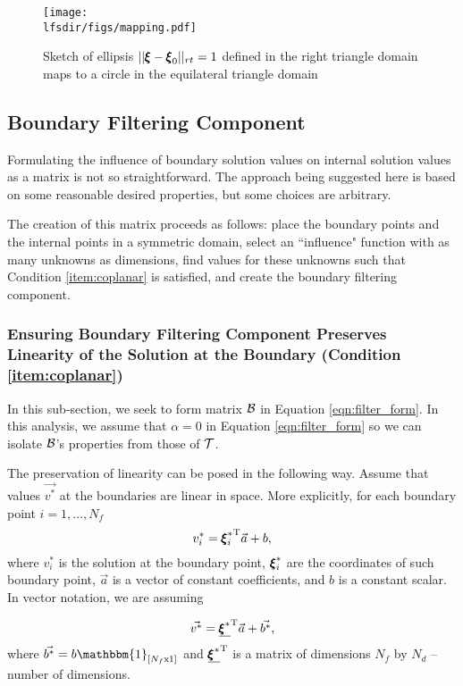 \begin{figure}\centering
\texttt{[image: \\lfsdir/figs/mapping.pdf]}
\caption{Sketch of ellipsis $||{\pmb \xi} -{\pmb \xi}_0||_{rt} = 1$ defined in the right triangle domain maps to a circle in the equilateral triangle domain}
\label{fig:mapping}
\end{figure}

\subsection{Boundary Filtering Component}

Formulating the influence of boundary solution values on internal solution values as a matrix is not so straightforward. The approach being suggested here is based on some reasonable desired properties, but some choices are arbitrary. 

The creation of this matrix proceeds as follows: place the boundary points and the internal points in a symmetric domain, select an ``influence" function with as many unknowns as dimensions, find values for these unknowns such that Condition \ref{item:coplanar} is satisfied, and create the boundary filtering component.

\subsubsection{Ensuring Boundary Filtering Component Preserves Linearity of the Solution at the Boundary (Condition \ref{item:coplanar})}
In this sub-section, we seek to form matrix $\mathcal{B}$ in Equation \ref{eqn:filter_form}. In this analysis, we assume that $\alpha = 0$ in Equation \ref{eqn:filter_form} so we can isolate $\mathcal{B}$'s properties from those of $\mathcal{T}$.

The preservation of linearity can be posed in the following way. Assume that values $\vec{v^*}$ at the boundaries are linear in space. More explicitly, for each boundary point $i = 1,\dots,N_f$
\begin{equation}
v^*_i = {{\pmb \xi}^*_i}^\mathrm{T}\vec{a} + b,
\end{equation}
where $v^*_i$ is the solution at the \ith boundary point, ${\pmb \xi}_i^*$ are the coordinates of such boundary point, $\vec{a}$ is a vector of constant coefficients, and $b$ is a constant scalar. In vector notation, we are assuming

\begin{equation}
\label{eq:linear}
\vec{v^*} = \underline{{\pmb \xi}^*}^\mathrm{T}\vec{a} + \vec{b^*},
\end{equation}
where $\vec{b^*} = b\mathbbm{1}_{[N_f \mathrm{x} 1]}$ and $\underline{{\pmb \xi}^*}^\mathrm{T}$ is a matrix of dimensions $N_f$ by $N_d$ --number of dimensions.


